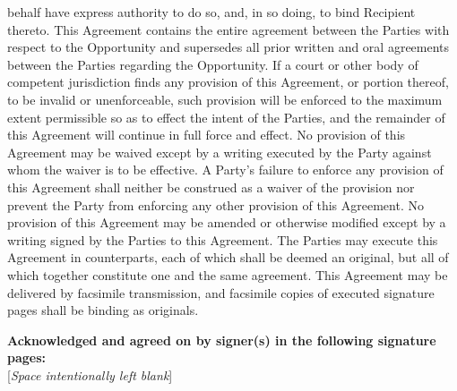 \documentclass[letterpaper, 12pt]{article}
\begin{document}
\begin{enumerate}
behalf have express authority to do so, and, in so doing, to bind Recipient thereto. This Agreement contains the entire agreement between the Parties with respect to the Opportunity and supersedes all prior written and oral agreements between the Parties regarding the Opportunity. If a court or other body of competent jurisdiction finds any provision of this Agreement, or portion thereof, to be invalid or unenforceable, such provision will be enforced to the maximum extent permissible so as to effect the intent of the Parties, and the remainder of this Agreement will continue in full force and effect. No provision of this Agreement may be waived except by a writing executed by the Party against whom the waiver is to be effective. A Party’s failure to enforce any provision of this Agreement shall neither be construed as a waiver of the provision nor prevent the Party from enforcing any other provision of this Agreement. No provision of this Agreement may be amended or otherwise modified except by a writing signed by the Parties to this Agreement. The Parties may execute this Agreement in counterparts, each of which shall be deemed an original, but all of which together constitute one and the same agreement. This Agreement may be delivered by facsimile transmission, and facsimile copies of executed signature pages shall be binding as originals.
\end{enumerate}

\begin{flushright}
\textbf{Acknowledged and agreed on by signer(s) in the following signature pages:}\\ 

\vspace{5cm}
\Large[\emph{Space intentionally left blank}]
\end{flushright}
\end{document}

